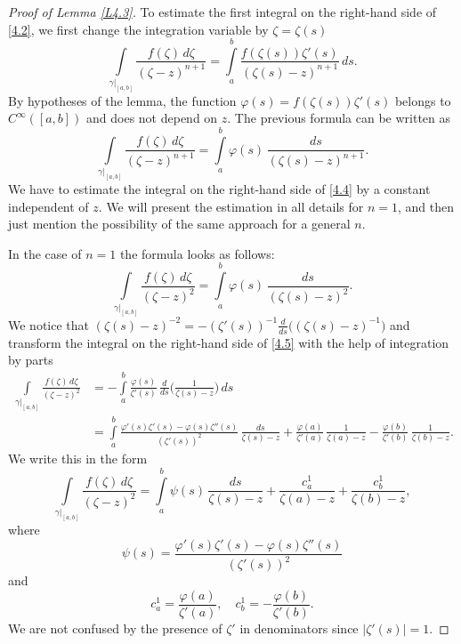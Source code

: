 \documentclass[12pt,reqno]{amsart}
\begin{document}
\begin{proof}[Proof of Lemma \ref{L4.3}]
To estimate the first integral on the right-hand side of \eqref{4.2}, we first change the integration variable by $\zeta=\zeta(s)$
$$
\int\limits_{\gamma|_{[a,b]}}\frac{f(\zeta)\,d\zeta}{(\zeta-z)^{n+1}}
=\int\limits_a^b \frac{f(\zeta(s))\zeta'(s)}{(\zeta(s)-z)^{n+1}}\,ds.
$$
By hypotheses of the lemma, the function $\varphi(s)=f(\zeta(s))\zeta'(s)$ belongs to $C^\infty([a,b])$ and does not depend on $z$. The previous formula can be written as
\begin{equation}
\int\limits_{\gamma|_{[a,b]}}\frac{f(\zeta)\,d\zeta}{(\zeta-z)^{n+1}}
=\int\limits_a^b \varphi(s)\,\frac{ds}{(\zeta(s)-z)^{n+1}}.
                                \label{4.4}
\end{equation}
We have to estimate the integral on the right-hand side of \eqref{4.4} by a constant independent of $z$. We will present the estimation in all details for $n=1$, and then just mention the possibility of the same approach for a general $n$.

In the case of $n=1$ the formula looks as follows:
\begin{equation}
\int\limits_{\gamma|_{[a,b]}}\frac{f(\zeta)\,d\zeta}{(\zeta-z)^2}
=\int\limits_a^b \varphi(s)\,\frac{ds}{(\zeta(s)-z)^2}.
                                \label{4.5}
\end{equation}
We notice that $(\zeta(s)-z)^{-2}=-(\zeta'(s))^{-1}\frac{d}{ds}\Big((\zeta(s)-z)^{-1}\Big)$ and transform the integral on the right-hand side of \eqref{4.5} with the help of integration by parts
$$
\begin{aligned}
\int\limits_{\gamma|_{[a,b]}}\frac{f(\zeta)\,d\zeta}{(\zeta-z)^2}
&=-\int\limits_a^b \frac{\varphi(s)}{\zeta'(s)}\,\frac{d}{ds}\Big(\frac{1}{\zeta(s)-z}\Big)\,ds\\
&=\int\limits_a^b \frac{\varphi'(s)\zeta'(s)-\varphi(s)\zeta''(s)}{(\zeta'(s))^2}\,\frac{ds}{\zeta(s)-z}
+\frac{\varphi(a)}{\zeta'(a)}\,\frac{1}{\zeta(a)-z}-\frac{\varphi(b)}{\zeta'(b)}\,\frac{1}{\zeta(b)-z}.
\end{aligned}
$$
We write this in the form
\begin{equation}
\int\limits_{\gamma|_{[a,b]}}\frac{f(\zeta)\,d\zeta}{(\zeta-z)^2}
=\int\limits_a^b \psi(s)\,\frac{ds}{\zeta(s)-z}
+\frac{c_a^1}{\zeta(a)-z}+\frac{c_b^1}{\zeta(b)-z},
                                \label{4.6}
\end{equation}
where
\begin{equation}
\psi(s)=\frac{\varphi'(s)\zeta'(s)-\varphi(s)\zeta''(s)}{(\zeta'(s))^2}
                                \label{4.7}
\end{equation}
and
$$
c_a^1=\frac{\varphi(a)}{\zeta'(a)},\quad c_b^1=-\frac{\varphi(b)}{\zeta'(b)}.
$$
We are not confused by the presence of $\zeta'$ in denominators since $|\zeta'(s)|=1$.



\end{proof}
\end{document}
